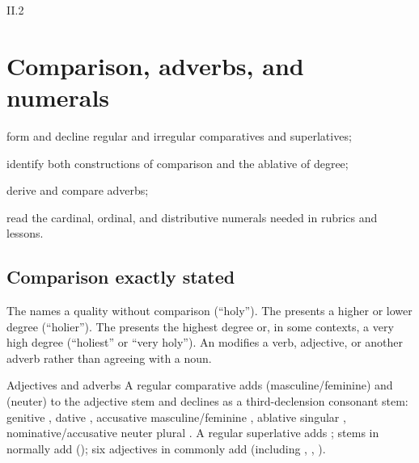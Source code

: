\begin{courseunit}{II.2}
\chapter{Comparison, adverbs, and numerals}

\begin{learningobjectives}
  \item form and decline regular and irregular comparatives and superlatives;
  \item identify both constructions of comparison and the ablative of degree;
  \item derive and compare adverbs;
  \item read the cardinal, ordinal, and distributive numerals needed in rubrics and lessons.
\end{learningobjectives}

\section{Comparison exactly stated}

The  names a quality without comparison (``holy''). The
 presents a higher or lower degree (``holier''). The
 presents the highest degree or, in some contexts, a
very high degree (``holiest'' or ``very holy''). An  modifies a
verb, adjective, or another adverb rather than agreeing with a noun.

\begin{grammarbox}{Adjectives and adverbs}
A regular comparative adds  (masculine/feminine) and  (neuter) to the
adjective stem and declines as a third-declension consonant stem: genitive ,
dative , accusative masculine/feminine , ablative singular
, nominative/accusative neuter plural .  A regular superlative adds
; stems in  normally add 
(); six adjectives in  commonly add 
(including , , ).


\end{grammarbox}
\end{courseunit}
